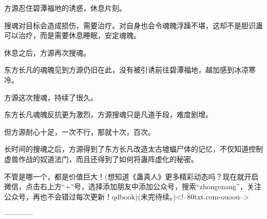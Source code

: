 \begin{this_body}
方源忍住碧潭福地的诱惑，休息片刻。

搜魂对目标会造成损伤，需要治疗。对自身也会令魂魄浮躁不堪，这却不是胆识蛊可以治疗，而是需要休息睡眠，安定魂魄。

休息之后，方源再次搜魂。

东方长凡的魂魄见到方源仍旧在此，没有被引诱前往碧潭福地，越加感到冰凉寒冷。

方源这次搜魂，持续了很久。

东方长凡魂魄反抗更为激烈，方源搜魂只是凡道手段，难度剧增。

但方源耐心十足，一次不行，那就十次，百次。

长时间的搜魂之后，方源得到了东方长凡改造太古墟蝠尸体的记忆，不仅知道控制虚兽作战的奴道法门，而且还得到了如何将蛊阵虚化的秘密。

不管是哪一个，都是价值巨大！(想知道《蛊真人》更多精彩动态吗？现在就开启微信，点击右上方“+”号，选择添加朋友中添加公众号，搜索“zhongenang”，关注公众号，再也不会错过每次更新！qdbook)(未完待续。)<!--80txt.com-ouoou-->

------------

\end{this_body}

